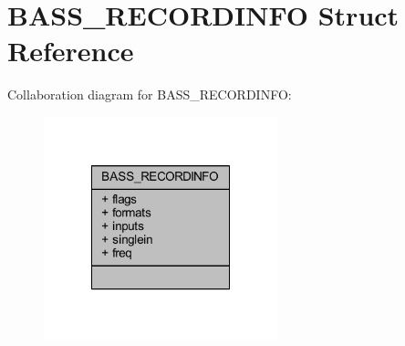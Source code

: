 \hypertarget{struct_b_a_s_s___r_e_c_o_r_d_i_n_f_o}{\section{B\-A\-S\-S\-\_\-\-R\-E\-C\-O\-R\-D\-I\-N\-F\-O Struct Reference}
\label{struct_b_a_s_s___r_e_c_o_r_d_i_n_f_o}
}


Collaboration diagram for B\-A\-S\-S\-\_\-\-R\-E\-C\-O\-R\-D\-I\-N\-F\-O\-:\nopagebreak
\begin{figure}[H]
\begin{center}
\leavevmode
\includegraphics[width=192pt]{struct_b_a_s_s___r_e_c_o_r_d_i_n_f_o__coll__graph}
\end{center}
\end{figure}
